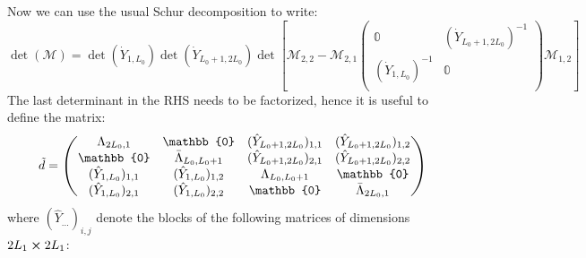 Now we can use the usual Schur decomposition to write:
\begin{equation}\label{det M pbc}
    \det(\mathcal{M}) = \det(\Dot{Y}_{1, L_0}) \det(\Dot{Y}_{L_0 + 1, 2L_0}) \det\left[\mathcal{M}_{2,2} - \mathcal{M}_{2,1} \begin{pmatrix}
        \mathbb{0} & (\Dot{Y}_{L_0 + 1, 2L_0})^{-1} \\
        (\Dot{Y}_{1, L_0})^{-1} & \mathbb{0} \\
    \end{pmatrix} \mathcal{M}_{1,2} \right] 
\end{equation}
The last determinant in the RHS needs to be factorized, hence it is useful to define the matrix:
\begin{equation}
    \Tilde{d} = \begin{pmatrix}
        \Lambda_{2L_0, 1} & \mathbb{0} & (\hat{Y}_{L_0 + 1, 2L_0})_{1,1} & (\hat{Y}_{L_0 + 1, 2L_0})_{1,2} \\
        \mathbb{0} & \Bar{\Lambda}_{L_0, L_0 + 1} & (\hat{Y}_{L_0 + 1, 2L_0})_{2,1} & (\hat{Y}_{L_0 + 1, 2L_0})_{2,2} \\
        (\hat{Y}_{1, L_0})_{1,1} & (\hat{Y}_{1, L_0})_{1,2} & \Lambda_{L_0, L_0 + 1} & \mathbb{0} \\
        (\hat{Y}_{1, L_0})_{2,1} & (\hat{Y}_{1, L_0})_{2,2} & \mathbb{0} & \Bar{\Lambda}_{2L_0, 1}
    \end{pmatrix}
\end{equation}
where $(\hat{Y}_{\dots})_{i, j}$ denote the blocks of the following matrices of dimensions $2L_1 \cross 2L_1$:
